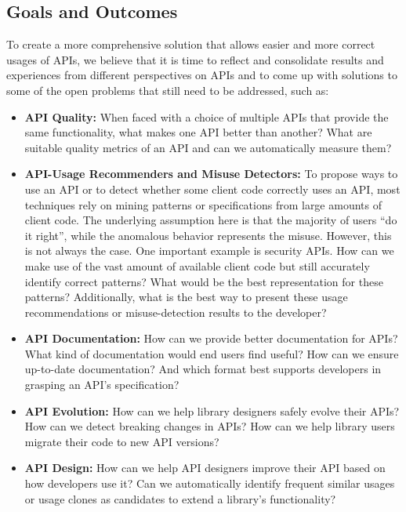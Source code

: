 \documentclass[10pt, conference]{IEEEtran}
\begin{document}
\subsection{Goals and Outcomes}
\label{sec:goals}
To create a more comprehensive solution that allows easier and more correct usages of APIs, we believe that it is time to reflect and consolidate results and experiences from different perspectives on APIs and to come up with solutions to some of the open problems that still need to be addressed, such as:

\begin{itemize}
\setlength\itemsep{5pt}

\item \textbf{API Quality:} When faced with a choice of multiple APIs that provide the same functionality, what makes one API better than another? What are suitable quality metrics of an API and can we automatically measure them?

\item \textbf{API-Usage Recommenders and Misuse Detectors:} To propose ways to use an API or to detect whether some client code correctly uses an API, most techniques rely on mining patterns or specifications from large amounts of client code. The underlying assumption here is that the majority of users ``do it right'', while the anomalous behavior represents the misuse. However, this is not always the case. One important example is security APIs. How can we make use of the vast amount of available client code but still accurately identify correct patterns? What would be the best representation for these patterns? Additionally, what is the best way to present these usage recommendations or misuse-detection results to the developer? 

\item\textbf{API Documentation:} How can we provide better documentation for APIs? What kind of documentation would end users find useful? How can we ensure up-to-date documentation? And which format best supports developers in grasping an API's specification?

\item \textbf{API Evolution:} How can we help library designers safely evolve their APIs? How can we detect breaking changes in APIs? How can we help library users migrate their code to new API versions?

\item \textbf{API Design:} How can we help API designers improve their API based on how developers use it? Can we automatically identify frequent similar usages or usage clones as candidates to extend a library's functionality?
\end{itemize}
\end{document}
